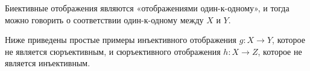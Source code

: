 Биективные отображения являются «отображениями один-к-одному», и тогда можно говорить о соответствии один-к-одному между \(X\) и \(Y\).

Ниже приведены простые примеры инъективного отображения \(g: X \rightarrow Y\), которое не является сюръективным, и сюръективного отображения \(h: X \rightarrow Z\), которое не является инъективным.

